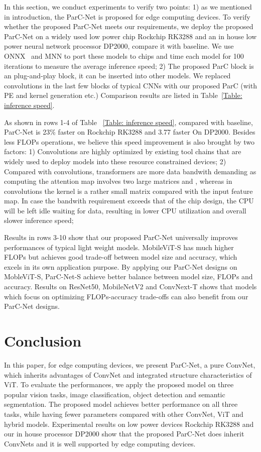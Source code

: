 \documentclass[10pt,twocolumn,letterpaper]{article}
\begin{document}
In this section, we conduct experiments to verify two points: 1) as we mentioned in introduction, the ParC-Net is proposed for edge computing devices. To verify whether the proposed ParC-Net meets our requirements, we deploy the proposed ParC-Net on a widely used low power chip Rockchip RK3288 and an in house low power neural network processor DP2000, compare it with baseline.  We use ONNX~\cite{bai2019} and MNN\cite{jiang2020mnn} to port these models to chips and time each model for 100 iterations to measure the average inference speed; 2) The proposed ParC block is an plug-and-play block, it can be inserted into other models. We replaced convolutions in the last few blocks of typical CNNs with our proposed ParC (with PE and kernel generation etc.) Comparison results are listed in Table~\ref{Table: inference speed}. 

As shown in rows 1-4 of Table ~\ref{Table: inference speed}, compared with baseline, ParC-Net is 23\% faster on Rockchip RK3288 and 3.77  faster On DP2000. Besides less FLOPs operations, we believe this speed improvement is also brought by two factors: 1) Convolutions are highly optimized by existing tool chains that are widely used to deploy models into these resource constrained devices; 2) Compared with convolutions, transformers are more data bandwith demanding as computing the attention map involves two large matrices  and , whereas in convolutions the kernel is a rather small matrix compared with the input feature map. In case the bandwith requirement exceeds that of the chip design, the CPU will be left idle waiting for data, resulting in lower CPU utilization and overall slower inference speed; 

Results in rows 3-10 show that our proposed ParC-Net universally improves performances of typical light weight models. MobileViT-S has much higher FLOPs but achieves good trade-off between model size and accuracy, which excels in its own application purpose. By applying our ParC-Net designs on MobleViT-S, ParC-Net-S achieve better balance between model size, FLOPs and accuracy. Results on ResNet50, MobileNetV2 and ConvNext-T shows that models which focus on optimizing FLOPs-accuracy trade-offs can also benefit from our ParC-Net designs.

\section{Conclusion}

In this paper, for edge computing devices, we present ParC-Net, a pure ConvNet, which inherits advantages of ConvNet and integrated structure characteristics of ViT. To evaluate the performances, we apply the proposed model on three popular vision tasks, image classification, object detection and semantic segmentation. The proposed model achieves better performance on all three tasks, while having fewer parameters compared with other ConvNet, ViT and hybrid models. Experimental results on low power devices Rockchip RK3288 and our in house processor DP2000 show that the proposed ParC-Net does inherit ConvNets and it is well supported by edge computing devices.  

{\small


}
\end{document}
